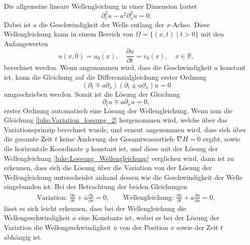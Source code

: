 Die allgemeine lineare Wellengleichung in einer Dimension lautet
\[
\partial_t^2 u - a^2 \partial_x^2 u  = 0.
\]
Dabei ist $a$ die Geschwindigkeit der Welle entlang der $x$-Achse.
Diese Wellengleichung kann in einem Bereich von $\Omega = \{(x,t)\mid t >0\}$ mit den Anfangswerten
\[
u(x,0) = u_0(x),\quad \frac{\partial u}{\partial t} = v_0(x),\quad x \in \mathbb{R},
\]
berechnet werden.
Wenn angenommen wird, dass die Geschwindigkeit $a$ konstant ist, kann die Gleichung auf die Differenzialgleichung erster Ordnung
\[
(\partial_t\mp a\partial_x)(\partial_t\pm a\partial_x) u  = 0
\]
 umgeschrieben werden.
Somit ist die Lösung der Gleichung
\begin{equation}
	\partial_t u \mp a\partial_x u = 0,
	\label{luke:Loesung_Wellengleichung}
\end{equation}
erster Ordnung automatisch eine Lösung der Wellengleichung.
Wenn nun die Gleichung \eqref{luke:Variation_loesung_2} hergenommen wird, welche über das Variationsprinzip berechnet wurde, und erneut angenommen wird, dass sich über die gesamte Zeit $t$ keine Änderung der Gesamtwassertiefe $ \nabla H = 0 $ ergibt, sowie die horizontale Koordinate $y$ konstant ist, und diese mit der Lösung der Wellengleichung \eqref{luke:Loesung_Wellengleichung} verglichen wird, dann ist zu erkennen, dass sich die Lösung über die Variation von der Lösung der Wellengleichung unterscheidet anhand dessen wie die Geschwindigkeit der Welle eingebunden ist.
Bei der Betrachtung der beiden Gleichungen
\begin{align}
	\text{Variation: }\frac{\partial \bar{u}}{\partial t} + \bar{u} \frac{\partial \bar{u}}{\partial x} = 0,
	\qquad
	\text{Wellengleichung: }\frac{\partial u}{\partial t} + a \frac{\partial u}{\partial x} = 0,
	\nonumber
\end{align}
lässt es sich leicht erkennen, dass bei der Wellengleichung die Wellengeschwindigkeit $a$ eine Konstante ist, wobei es bei der Lösung der Variation die Wellengeschwindigkeit $\bar{u}$ von der Position $x$ sowie der Zeit $t$ abhängig ist.

